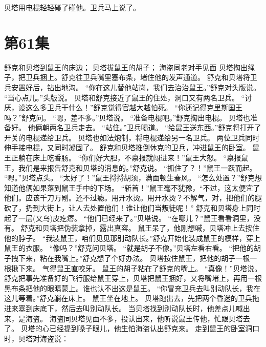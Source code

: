 \documentclass[a4paper,12pt,UTF8,twoside]{ctexbook}
\begin{document}
        贝塔用电棍轻轻碰了碰他。卫兵马上说了。   \chapter{第61集} 
        舒克和贝塔到鼠王的床边； 
        贝塔拔鼠王的胡子； 
        海盗同老对手见面   
        贝塔掏出绳子，把卫兵捆上。舒克往卫兵嘴里塞布条，堵住他的发声通道。 
        舒克和贝塔将卫兵安置好后，钻出地沟。 
        “你在这儿替他站岗，我们去治治鼠王。”舒克对头版说。 
        “当心点儿。”头版说。 
        贝塔和舒克接近了鼠王的住处，洞口又有两名卫兵。 
        “讨厌，设这么多卫兵干什么！”舒克觉得官越大越怕死。 
        “你还记得克里斯国王吗？”舒克问。 
        “嗯，差不多。”贝塔说。 
        “准备电棍吧。”舒克掏出电棍。 
        贝塔也准备好。 
        他俩朝两名卫兵走去。 
        “站住。”卫兵喝道。 
        “给鼠王送东西。”舒克将打开了开关的电棍递给卫兵。 
        贝塔也如法炮制，将电棍递给另一名卫兵。 
        两位卫兵同时伸手接电棍，又同时凝固了。 
        舒克和贝塔推倒休克的卫兵，冲进鼠王的卧室。 
        鼠王正躺在床上吃香肠。 
        “你们好大胆，不禀报就闯进来！”鼠王大怒。 
        “禀报鼠王，我们是来报告舒克和贝塔的消息的。”舒克说。 
        “抓住了？！”鼠王一跃而起。 
        “嗯。”贝塔点头。 
        “太好了！”鼠王捋捋胡须，满面顿生春风。 
        “怎么处置？”舒克想知道他俩如果落到鼠王手中的下场。 
        “斩首！”鼠王毫不犹豫，“不过，这太便宜了他们。应该千刀万剐。还不过瘾。用开水烫。用开水烫？不解气，对，把他们的腿砍了，扔到大街上，让人去处置他们！谁让他们当叛徒呢！” 
        舒克和贝塔身上同时起了一层(又鸟)皮疙瘩。 
        “他们已经来了。”贝塔说。 
        “在哪儿？”鼠王看看洞里，没有。 
        舒克和贝塔把伪装拿掉，露出真容。 
        鼠王呆了，他刚想喊，贝塔冲上去按住他的脖子。 
        “我装鼠王，咱们见见那别动队长。”舒克开始化装成鼠王的模样，穿上鼠王的衣服。 
        “像吗？”舒克问贝塔。 
        “就是胡子不像。”贝塔左看右看。 
        “把他的胡子拽下来，粘在我嘴上。”舒克想了个好办法。 
        贝塔按住鼠王，把他的胡子一根一根揪下来。 
        气得鼠王直咬牙。 
        鼠王的胡子粘在了舒克的嘴上。 
        “真像！”贝塔说。 
        舒克把事先准备好的飞行服给鼠王穿上，贝塔把鼠王捆好，又将嘴堵上，再用一根黑布条把他的眼睛蒙上。谁也认不出这是鼠王。 
        “你冒充卫兵去叫别动队长，我在这儿等着。”舒克躺在床上。 
        鼠王坐在地上。 
        贝塔跑出去，先把两个昏迷的卫兵拖进来塞到床底下，然后去叫别动队长。 
        当贝塔找到别动队长时，他差点儿喊出来，是海盗。 
        海盗同贝塔见面不多，投认出来，他听说鼠王传他，忙跟贝塔去了。 
        贝塔的心已经提到嗓子眼儿，他生怕海盗认出舒克来。 
        走到鼠王的卧室洞口时，贝塔对海盗说： 
\end{document}
